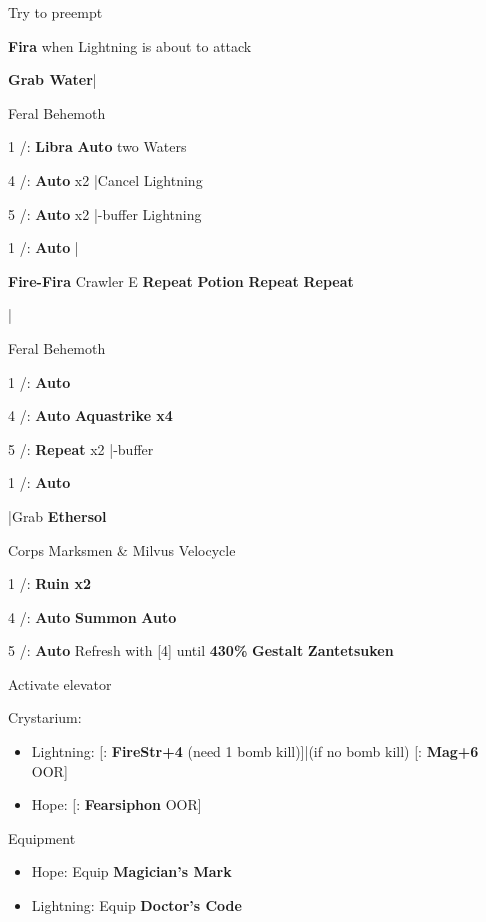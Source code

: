 \begin{mainlist}
	\item Try to preempt
	\item {} \textbf{Fira} when Lightning is about to attack
	\item \textbf{Grab Water}|\skip
\end{mainlist}
\begin{fight}{Feral Behemoth}
	\item [1] \rav/\com: \textbf{Libra} \to \textbf{Auto} two Waters
	\item [4] \rav/\rav: \textbf{Auto} x2 |Cancel Lightning
	\item [5] \rav/\rav: \textbf{Auto} x2 |\com-buffer Lightning
	\item [1] \rav/\com: \textbf{Auto} |\skip
\end{fight}
\begin{mainlist}
	\item {} \textbf{Fire-Fira} Crawler E \to [6] \textbf{Repeat} \to \textbf{\textbf{Potion}} \to \textbf{Repeat} \to [1] \textbf{Repeat}
	\item {}|
\end{mainlist}
\begin{fight}{Feral Behemoth}
	\item [1] \com/\rav: \textbf{Auto}
	\item [4] \rav/\rav: \textbf{Auto} \to \textbf{Aquastrike x4}
	\item [5] \rav/\rav: \textbf{Repeat} x2 |\com-buffer
	\item [1] \com/\rav: \textbf{Auto}
\end{fight}
\begin{mainlist}
	\item \skip|Grab \textbf{Ethersol}
\end{mainlist}
\begin{fight}{Corps Marksmen \& Milvus Velocycle}
	\item [1] \com/\rav: \textbf{Ruin x2}
	\item [4] \rav/\rav: \textbf{Auto} \to \textbf{Summon} \to \textbf{Auto}
	\item [5] \rav/\rav: \textbf{Auto} \to Refresh with [4] until \textbf{430\%} \to \textbf{Gestalt} \to \textbf{Zantetsuken}
	\item Activate elevator
\end{fight}
\begin{menu}
	\item Crystarium:
	\begin{itemize}
		\item Lightning: [\rav: \textbf{Fire}\to\textbf{Str+4} (need 1 bomb kill)]|(if no bomb kill) [\com: \textbf{Mag+6} OOR]
		\item Hope: [\rav: \textbf{Fearsiphon} OOR]
	\end{itemize}
	\item Equipment
	\begin{itemize}
		\item Hope: Equip \textbf{Magician's Mark}
		\item Lightning: Equip \textbf{Doctor's Code}
	\end{itemize}
\end{menu}
